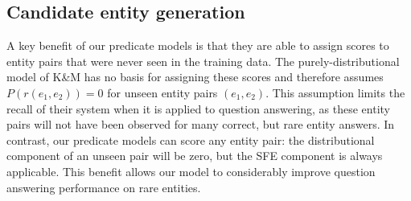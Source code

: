 \documentclass[11pt]{article}
\newcommand{\lexicalpredicate}[1]{\ensuremath{\textit{#1}}}
\newcommand{\entity}[1]{\ensuremath{\textsc{#1}}}
\begin{document}


\subsection{Candidate entity generation}
\label{sec:better-candidates}

A key benefit of our predicate models is that they are able to assign
scores to entity pairs that were never seen in the training data. The
purely-distributional model of K\&M has no basis for assigning these
scores and therefore assumes $P(r(e_1,e_2)) = 0$ for unseen entity
pairs $(e_1,e_2)$. This assumption limits the recall of their system
when it is applied to question answering, as these entity pairs will
not have been observed for many correct, but rare entity answers. In
contrast, our predicate models can score any entity pair: the
distributional component of an unseen pair will be zero, but the SFE
component is always applicable. This benefit allows our model to
considerably improve question answering performance on rare entities.

% 
\end{document}

